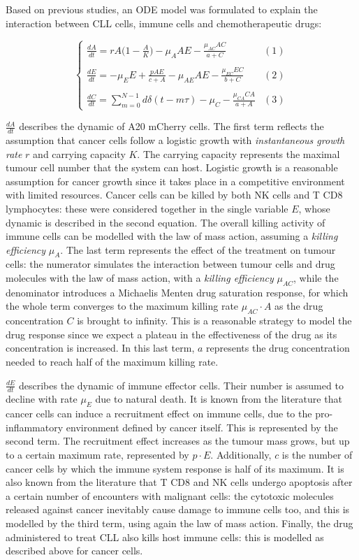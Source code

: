 Based on previous studies, an ODE model was formulated to explain the interaction between CLL cells, immune cells and chemotherapeutic drugs:

\[
\begin{cases} 
	\frac{dA}{dt} = rA \bigl( 1 - \frac{A}{K} \bigr) - \mu_A AE - \frac{\mu_{AC} AC}{a+C} & (1)\\ \\
	\frac{dE}{dt} = -\mu_E E + \frac{pAE}{c+A} - \mu_{AE} AE - \frac{\mu_{EC} EC}{b+C} & (2) \\ \\
	\frac{dC}{dt} = \sum_{m=0}^{N-1} d\delta (t-m\tau) - \mu_{C} - \frac{\mu_{CA} CA}{a+A} & (3) 
\end{cases}
\]

$\frac{dA}{dt}$ describes the dynamic of A20 mCherry cells. The first term reflects the assumption that cancer cells follow a logistic growth with \textit{instantaneous growth rate} $r$ and carrying capacity $K$. The carrying capacity represents the maximal tumour cell number that the system can host. Logistic growth is a reasonable assumption for cancer growth since it takes place in a competitive environment with limited resources. Cancer cells can be killed by both NK cells and T CD8 lymphocytes: these were considered together in the single variable $E$, whose dynamic is described in the second equation. The overall killing activity of immune cells can be modelled with the law of mass action, assuming a \textit{killing efficiency} $\mu_{A}$. The last term represents the effect of the treatment on tumour cells: the numerator simulates the interaction between tumour cells and drug molecules with the law of mass action, with a \textit{killing efficiency} $\mu_{AC}$, while the denominator introduces a Michaelis Menten drug saturation response, for which the whole term converges to the maximum killing rate $\mu_{AC} \cdot A$ as the drug concentration $C$ is brought to infinity. This is a reasonable strategy to model the drug response since we expect a plateau in the effectiveness of the drug as its concentration is increased. In this last term, $a$ represents the drug concentration needed to reach half of the maximum killing rate. \par
\vspace{0.4cm}
$\frac{dE}{dt}$ describes the dynamic of immune effector cells. Their number is assumed to decline with rate $\mu_{E}$ due to natural death. It is known from the literature that cancer cells can induce a recruitment effect on immune cells, due to the pro-inflammatory environment defined by cancer itself. This is represented by the second term. The recruitment effect increases as the tumour mass grows, but up to a certain maximum rate, represented by $p \cdot E$. Additionally, $c$ is the number of cancer cells by which the immune system response is half of its maximum. It is also known from the literature that T CD8 and NK cells undergo apoptosis after a certain number of encounters with malignant cells: the cytotoxic molecules released against cancer inevitably cause damage to immune cells too, and this is modelled by the third term, using again the law of mass action. Finally, the drug administered to treat CLL also kills host immune cells: this is modelled as described above for cancer cells. \par
